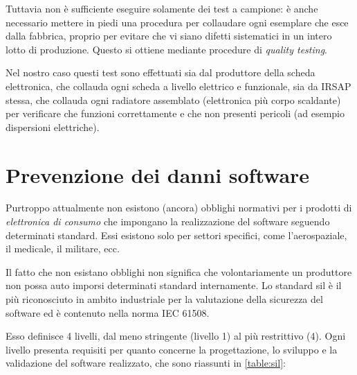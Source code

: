\documentclass[12pt,a4paper,twoside,titlepage]{book}
\begin{document}
Tuttavia non è sufficiente eseguire solamente dei test a campione: è anche necessario mettere 
in piedi una procedura per collaudare ogni esemplare che esce dalla fabbrica, proprio per evitare che vi siano 
difetti sistematici in un intero lotto di produzione. Questo si ottiene mediante procedure di \textit{quality testing}. 

Nel nostro caso questi test sono effettuati sia dal produttore della scheda elettronica, 
che collauda ogni scheda a livello elettrico e funzionale, sia da IRSAP stessa, che collauda ogni radiatore 
assemblato (elettronica più corpo scaldante) per verificare che funzioni correttamente e che non presenti 
pericoli (ad esempio dispersioni elettriche). 

\section{Prevenzione dei danni software}

Purtroppo attualmente non esistono (ancora) obblighi normativi per 
i prodotti di \textit{elettronica di consumo} che impongano la realizzazione del software seguendo determinati 
standard. Essi esistono solo per settori specifici, come l'aerospaziale, il medicale, il militare, ecc. 

Il fatto che non esistano obblighi non significa che volontariamente un produttore non possa auto imporsi determinati 
standard internamente. Lo standard \acrfull{sil} è il più riconosciuto in ambito industriale per la valutazione 
della sicurezza del software ed è contenuto nella norma IEC 61508. 

Esso definisce 4 livelli, dal meno stringente (livello 1) al più restrittivo (4). Ogni 
livello presenta requisiti per quanto concerne la progettazione, lo sviluppo e la validazione 
del software realizzato, che sono riassunti in \autoref{table:sil}:
\end{document}
